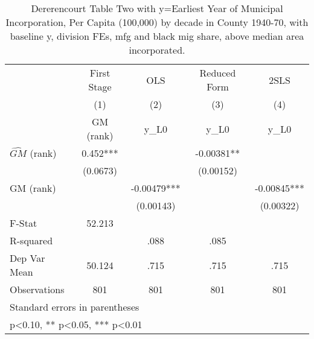 \begin{table}[htbp]\centering
\def\sym#1{\ifmmode^{#1}\else\(^{#1}\)\fi}
\caption{Dererencourt Table Two with y=Earliest Year of Municipal Incorporation, Per Capita (100,000) by decade in County 1940-70, with baseline y, division FEs, mfg and black mig share, above median area incorporated.}
\begin{tabular}{l*{4}{c}}
\toprule
                    & First Stage   &         OLS   &Reduced Form   &        2SLS   \\
                    &\multicolumn{1}{c}{(1)}&\multicolumn{1}{c}{(2)}&\multicolumn{1}{c}{(3)}&\multicolumn{1}{c}{(4)}\\
                    &\multicolumn{1}{c}{GM  (rank)}&\multicolumn{1}{c}{y\_L0}&\multicolumn{1}{c}{y\_L0}&\multicolumn{1}{c}{y\_L0}\\
\midrule
$\hat{GM}$ (rank)   &       0.452***&               &    -0.00381** &               \\
                    &    (0.0673)   &               &   (0.00152)   &               \\
\addlinespace
GM  (rank)          &               &    -0.00479***&               &    -0.00845***\\
                    &               &   (0.00143)   &               &   (0.00322)   \\
\midrule
F-Stat              &      52.213   &               &               &               \\
R-squared           &               &        .088   &        .085   &               \\
Dep Var Mean        &      50.124   &        .715   &        .715   &        .715   \\
Observations        &         801   &         801   &         801   &         801   \\
\bottomrule
\multicolumn{5}{l}{\footnotesize Standard errors in parentheses}\\
\multicolumn{5}{l}{\footnotesize * p<0.10, ** p<0.05, *** p<0.01}\\
\end{tabular}
\end{table}
